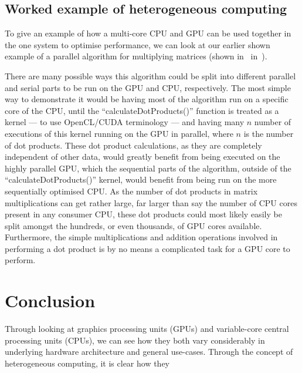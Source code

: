 \documentclass[a4paper,11pt]{article}
\begin{document}

\subsection{Worked example of heterogeneous computing} %
\label{sub:worked_example_of_heterogeneous_computing}
To give an example of how a multi-core CPU and GPU can be used together in the one system to optimise performance, we
can look at our earlier shown example of a parallel algorithm for multiplying matrices (shown in~
in~).

There are many possible ways this algorithm could be split into different parallel and serial parts to be run on the GPU
and CPU, respectively. The most simple way to demonstrate it would be having most of the algorithm run on a specific core
of the CPU, until the ``calculateDotProducts()'' function is treated as a kernel --- to use OpenCL/CUDA terminology ---
and having many $n$ number of executions of this kernel running on the GPU in parallel, where $n$ is the number of dot
products. These dot product calculations, as they are completely independent of other data, would greatly benefit from
being executed on the highly parallel GPU, which the sequential parts of the algorithm, outside of the ``calculateDotProducts()''
kernel, would benefit from being run on the more sequentially optimised CPU. As the number of dot products in matrix
multiplications can get rather large, far larger than say the number of CPU cores present in any consumer CPU, these
dot products could most likely easily be split amongst the hundreds, or even thousands, of GPU cores available. Furthermore,
the simple multiplications and addition operations involved in performing a dot product is by no means a complicated
task for a GPU core to perform.



\section{Conclusion} %
Through looking at graphics processing units (GPUs) and variable-core central processing units (CPUs), we can see how
they both vary considerably in underlying hardware architecture and general use-cases. Through the concept of heterogeneous
computing, it is clear how they
\label{sec:conclusion}





\end{document}
